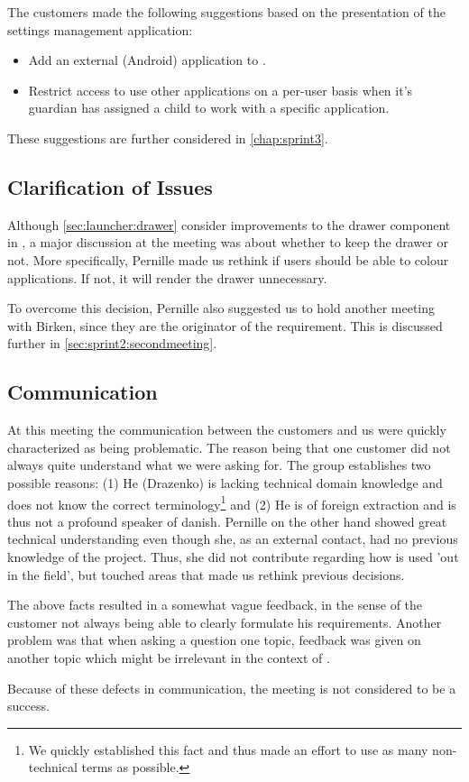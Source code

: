 The customers made the following suggestions based on the presentation of the settings management application:

\begin{itemize}
\item Add an external (Android) application to \launcher.
\item Restrict access to use other applications on a per-user basis when it's guardian has assigned a child to work with a specific application.
\end{itemize}

These suggestions are further considered in \cref{chap:sprint3}.


\subsection{Clarification of Issues}
Although \cref{sec:launcher:drawer} consider improvements to the drawer component in \giraf, a major discussion at the meeting was about whether to keep the drawer or not.
More specifically, Pernille made us rethink if users should be able to colour applications.
If not, it will render the drawer unnecessary.

To overcome this decision, Pernille also suggested us to hold another meeting with Birken, since they are the originator of the requirement.
This is discussed further in \cref{sec:sprint2:secondmeeting}.

\subsection{Communication}
At this meeting the communication between the customers and us were quickly characterized as being problematic.
The reason being that one customer did not always quite understand what we were asking for.
The group establishes two possible reasons:
(1) He (Drazenko) is lacking technical domain knowledge and does not know the correct terminology\footnote{We quickly established this fact and thus made an effort to use as many non-technical terms as possible.} and (2) He is of foreign extraction and is thus not a profound speaker of danish.
Pernille on the other hand showed great technical understanding even though she, as an external contact, had no previous knowledge of the \giraf project.
Thus, she did not contribute regarding how \giraf is used 'out in the field', but touched areas that made us rethink previous decisions.

The above facts resulted in a somewhat vague feedback, in the sense of the customer not always being able to clearly formulate his requirements.
Another problem was that when asking a question one topic, feedback was given on another topic which might be irrelevant in the context of \launcher.

Because of these defects in communication, the meeting is not considered to be a success.